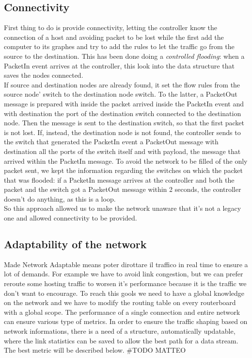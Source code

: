 \documentclass[conference,10pt]{IEEEtran}
\begin{document}
\subsection{Connectivity}\label{sec:connectivity}
First thing to do is provide connectivity, letting the controller know the connection of a host and avoiding packet to be lost while the first
add the computer to its graphes and try to add the rules to let the traffic go from the source to the destination. This has been done doing a
\textit{controlled flooding}: when a PacketIn event arrives at the controller, this look into the data structure that saves the nodes connected.
\\ If source and destination nodes are already found, it set the flow rules from the source node' switch to the destination node switch. To the latter,
a PacketOut message is prepared with inside the packet arrived inside the PacketIn event and with destination the port of the destination switch connected
to the destination node. Then the message is sent to the destination switch, so that the first packet is not lost.
If, instead, the destination node is not found, the controller sends to the switch that generated the PacketIn event a PacketOut message
with destination all the ports of the switch itself and with payload, the message that arrived within the PacketIn message.
To avoid the network to be filled of the only packet sent, we kept the information regarding the switches on which the packet that was flooded:
if a PacketIn message arrives at the controller and both the packet and the switch got a PacketOut message within 2 seconds, the controller doesn't
do anything, as this is a loop.
\\ So this approach allowed us to make the network unaware that it's not a legacy one and allowed connectivity to be provided.
\subsection{Adaptability of the network}
Made Network Adaptable means poter dirottare il traffico in real time to ensure a lot of demands. For example we have to avoid link congestion,
but we can prefer reroute some hosting traffic to worsen it's performance because  it is the traffic we don't want to encourage.
To reach this gools we need to have a global knowledge on the network and we have to modify the routing table on every routerboard with a
global scope.
The performance of a single connection and entire network can ensure various type of metrics.
In order to ensure the traffic shaping based on network informations, there is a need of a structure,
automatically updatable, where the link statistics can be saved to allow the best path for a data stream. The best metric will be described below.
\#TODO MATTEO
\end{document}
